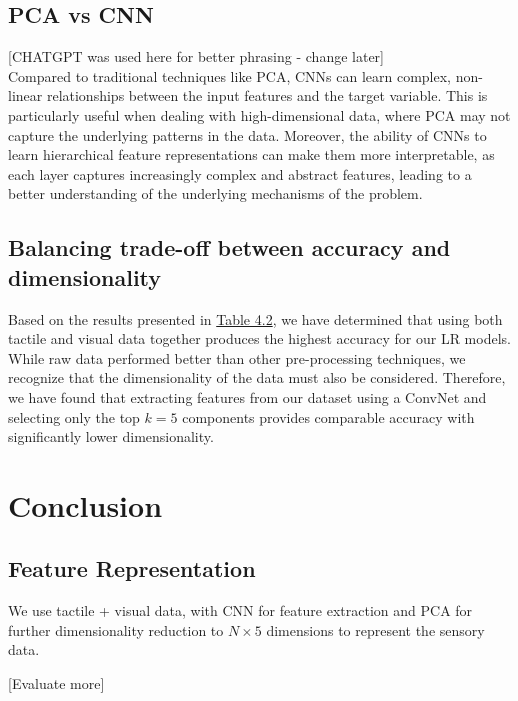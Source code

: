 \documentclass[11pt, a4paper]{report}
\begin{document}
\subsection{PCA vs CNN}
\label{sec:4.5.2}
{\color{red} [CHATGPT was used here for better phrasing - change later]}\\
Compared to traditional techniques like PCA, CNNs can learn complex, non-linear relationships between the input features and the target variable. This is particularly useful when dealing with high-dimensional data, where PCA may not capture the underlying patterns in the data. Moreover, the ability of CNNs to learn hierarchical feature representations can make them more interpretable, as each layer captures increasingly complex and abstract features, leading to a better understanding of the underlying mechanisms of the problem.


\subsection{Balancing trade-off between accuracy and dimensionality}
\label{sec:4.5.2}
Based on the results presented in \hyperref[tbl:4.2]{Table 4.2}, we have determined that using both tactile and visual data together produces the highest accuracy for our LR models. While raw data performed better than other pre-processing techniques, we recognize that the dimensionality of the data must also be considered. Therefore, we have found that extracting features from our dataset using a ConvNet and selecting only the top $k=5$ components provides comparable accuracy with significantly lower dimensionality.


\section{Conclusion}
\label{sec:4.6}


\subsection{Feature Representation}
\label{sec:4.6.1}
We use tactile + visual data, with CNN for feature extraction and PCA for further dimensionality reduction to $N\times 5$ dimensions to represent the sensory data.

[Evaluate more]



\end{document}
